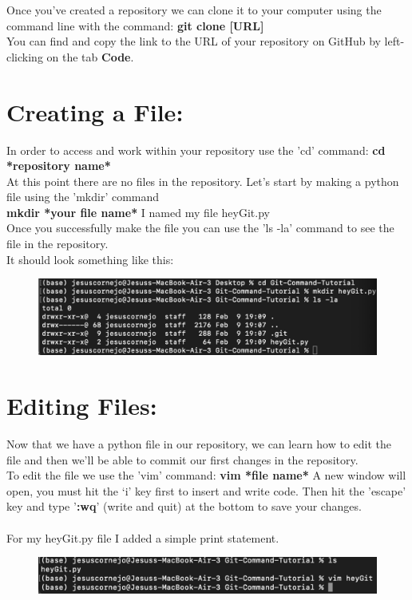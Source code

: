 \documentclass{article}
\begin{document}
Once you've created a repository we can clone it to your computer using the command line with the command:  \textbf{git clone [URL]}\\
You can find and copy the link to the URL of your repository on GitHub by left-clicking on the tab \textbf{Code}.\\

\section{Creating a File:}
In order to access and work within your repository use the 'cd' command:  \textbf{cd *repository name*}\\
At this point there are no files in the repository. Let's start by making a python file using the 'mkdir' command\\
\textbf{mkdir *your file name*} I named my file heyGit.py\\
Once you successfully make the file you can use the 'ls -la' command to see the file in the repository.\\
It should look something like this:

\begin{figure}[h]
\includegraphics[scale = 1]{screenshots/sc2.png}
\centering
\end{figure}

\section{Editing Files:}
Now that we have a python file in our repository, we can learn how to edit the file and then we'll be able to commit our first changes in the repository.\\
To edit the file we use the 'vim' command: \textbf{vim *file name*} A new window will open, you must hit the ‘i’ key first to insert and write code. Then hit the 'escape' key and type '\textbf{:wq}' (write and quit) at the bottom to save your changes.\\ \\
For my heyGit.py file I added a simple print statement.

\begin{figure}[h]
\includegraphics[scale = 1]{screenshots/sc3.png}
\centering
\end{figure}
\end{document}
